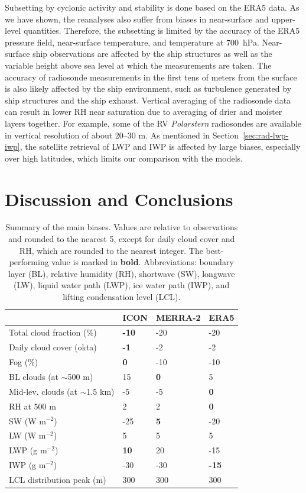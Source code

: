 \documentclass[draft]{agujournal2019}
\begin{document}
Subsetting by cyclonic activity and stability is done based on the ERA5 data. As we have shown, the reanalyses also suffer from biases in near-surface and upper-level quantities. Therefore, the subsetting is limited by the accuracy of the ERA5 pressure field, near-surface temperature, and temperature at 700~hPa. Near-surface ship observations are affected by the ship structures as well as the variable height above sea level at which the measurements are taken. The accuracy of radiosonde measurements in the first tens of meters from the surface is also likely affected by the ship environment, such as turbulence generated by ship structures and the ship exhaust. Vertical averaging of the radiosonde data can result in lower RH near saturation due to averaging of drier and moister layers together. For example, some of the RV \textit{Polarstern} radiosondes are available in vertical resolution of about 20--30 m. As mentioned in Section~\ref{sec:rad-lwp-iwp}, the satellite retrieval of LWP and IWP is affected by large biases, especially over high latitudes, which limits our comparison with the models.

\section{Discussion and Conclusions}

\begin{table}[t]
\caption{Summary of the main biases. Values are relative to observations and rounded to the nearest 5, except for daily cloud cover and RH, which are rounded to the nearest integer. The best-performing value is marked in \textbf{bold}. Abbreviations: boundary layer (BL), relative humidity (RH), shortwave (SW), longwave (LW), liquid water path (LWP), ice water path (IWP), and lifting condensation level (LCL).}
\label{tab:summary}
\centering
\begin{tabular}{llll}
& ICON & MERRA-2 & ERA5\\
\hline
Total cloud fraction (\%) & \textbf{-10} & -20 & -20\\
Daily cloud cover (okta) & \textbf{-1} & -2 & -2\\
Fog (\%) & \textbf{0} & -10 & -10\\
BL clouds (at $\sim$500 m) & 15 & \textbf{0} & 5\\
Mid-lev. clouds (at $\sim$1.5 km) & -5 & -5 & \textbf{0}\\
RH at 500 m & 2 & 2 & \textbf{0}\\
SW (W m$^{-2}$) & -25 & \textbf{5} & -20\\
LW (W m$^{-2}$) & 5 & 5 & 5\\
LWP (g m$^{-2}$) & \textbf{10} & 20 & -15\\
IWP (g m$^{-2}$) & -30 & -30 & \textbf{-15}\\
LCL distribution peak (m) & 300 & 300 & 300\\
\hline
\end{tabular}
\end{table}
\end{document}
